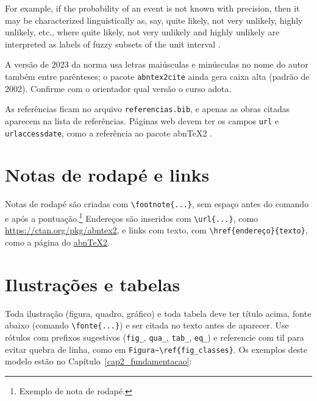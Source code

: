 \begin{citacao}
For example, if the probability of an event is not known with precision, then it may be characterized linguistically as, say, quite likely, not very unlikely, highly unlikely, etc., where quite likely, not very unlikely and highly unlikely are interpreted as labels of fuzzy subsets of the unit interval \cite[p.~202]{zadeh1976fuzzy}.
\end{citacao}

A versão de 2023 da norma usa letras maiúsculas e minúsculas no nome do autor também entre parênteses; o pacote \texttt{abntex2cite} ainda gera caixa alta (padrão de 2002). Confirme com o orientador qual versão o curso adota.

As referências ficam no arquivo \texttt{referencias.bib}, e apenas as obras citadas aparecem na lista de referências. Páginas web devem ter os campos \texttt{url} e \texttt{urlaccessdate}, como a referência ao pacote abnTeX2 \cite{abntex2ctan}.

\section{Notas de rodapé e links}

Notas de rodapé são criadas com \verb|\footnote{...}|, sem espaço antes do comando e após a pontuação.\footnote{Exemplo de nota de rodapé.} Endereços são inseridos com \verb|\url{...}|, como \url{https://ctan.org/pkg/abntex2}, e links com texto, com \verb|\href{endereço}{texto}|, como a página do \href{https://ctan.org/pkg/abntex2}{abnTeX2}.

\section{Ilustrações e tabelas}

Toda ilustração (figura, quadro, gráfico) e toda tabela deve ter título acima, fonte abaixo (comando \verb|\fonte{...}|) e ser citada no texto antes de aparecer. Use rótulos com prefixos sugestivos (\texttt{fig\_}, \texttt{qua\_}, \texttt{tab\_}, \texttt{eq\_}) e referencie com til para evitar quebra de linha, como em \verb|Figura~\ref{fig_classes}|. Os exemplos deste modelo estão no Capítulo~\ref{cap2_fundamentacao}:

